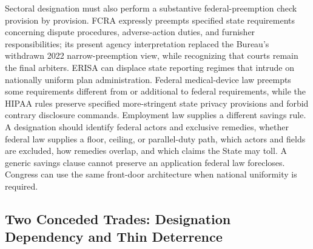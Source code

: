 Sectoral designation must also perform a substantive federal-preemption check provision by provision. FCRA expressly preempts specified state requirements concerning dispute procedures, adverse-action duties, and furnisher responsibilities; its present agency interpretation replaced the Bureau's withdrawn 2022 narrow-preemption view, while recognizing that courts remain the final arbiters. ERISA can displace state reporting regimes that intrude on nationally uniform plan administration. Federal medical-device law preempts some requirements different from or additional to federal requirements, while the HIPAA rules preserve specified more-stringent state privacy provisions and forbid contrary disclosure commands. Employment law supplies a different savings rule. A designation should identify federal actors and exclusive remedies, whether federal law supplies a floor, ceiling, or parallel-duty path, which actors and fields are excluded, how remedies overlap, and which claims the State may toll. A generic savings clause cannot preserve an application federal law forecloses. Congress can use the same front-door architecture when national uniformity is required.

\subsection{Two Conceded Trades: Designation Dependency and Thin Deterrence}
\label{sec:trades}

